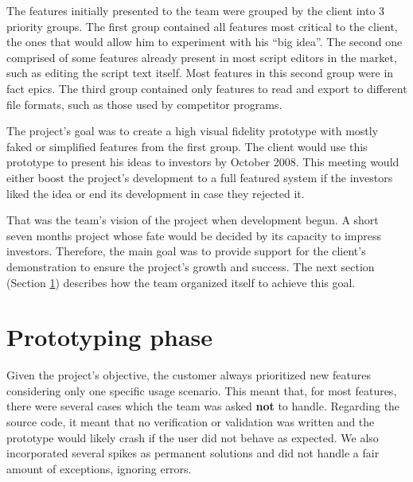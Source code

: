 \documentclass[lnbip]{svmultln}
\begin{document}

The features initially presented to the team were grouped by the
client into 3 priority groups. The first group contained all features
most critical to the client, the ones that would allow him to
experiment with his ``big idea''. The second one comprised of some
features already present in most script editors in the market, such as
editing the script text itself. Most features in this second group
were in fact epics. The third group contained only features to read
and export to different file formats, such as those used by competitor
programs.

The project's goal was to create a high visual fidelity prototype with
mostly faked or simplified features from the first group. The client
would use this prototype to present his ideas to investors by October
2008. This meeting would either boost the project's development to a
full featured system if the investors liked the idea or end its
development in case they rejected it.

That was the team's vision of the project when development begun. A
short seven months project whose fate would be decided by its capacity
to impress investors. Therefore, the main goal was to provide support
for the client's demonstration to ensure the project's growth and
success. The next section (Section \ref{sec:working}) describes how
the team organized itself to achieve this goal.

\section{Prototyping phase}
\label{sec:working}

Given the project's objective, the customer always prioritized new
features considering only one specific usage scenario. This meant
that, for most features, there were several cases which the team was
asked \textbf{not} to handle. Regarding the source code, it meant that
no verification or validation was written and the prototype would
likely crash if the user did not behave as expected. We also
incorporated several spikes as permanent solutions and did not handle
a fair amount of exceptions, ignoring errors.
\end{document}
